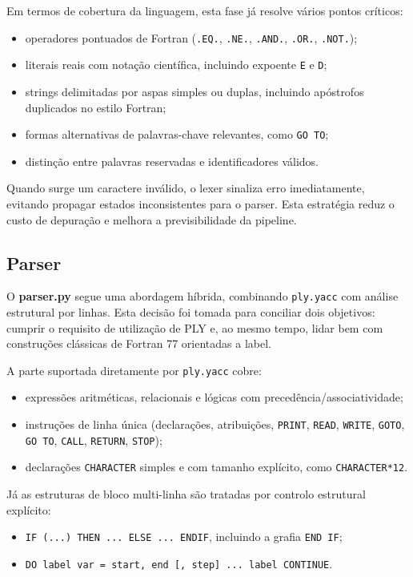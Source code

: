 \documentclass{article}
\begin{document}
Em termos de cobertura da linguagem, esta fase já resolve vários pontos críticos:
\begin{itemize}
\item operadores pontuados de Fortran (\texttt{.EQ.}, \texttt{.NE.}, \texttt{.AND.}, \texttt{.OR.}, \texttt{.NOT.});
\item literais reais com notação científica, incluindo expoente \texttt{E} e \texttt{D};
\item strings delimitadas por aspas simples ou duplas, incluindo apóstrofos duplicados no estilo Fortran;
\item formas alternativas de palavras-chave relevantes, como \texttt{GO TO};
\item distinção entre palavras reservadas e identificadores válidos.
\end{itemize}

Quando surge um caractere inválido, o lexer sinaliza erro imediatamente, evitando propagar estados inconsistentes para o parser. Esta estratégia reduz o custo de depuração e melhora a previsibilidade da pipeline.

\subsection{Parser}

O \textbf{parser.py} segue uma abordagem híbrida, combinando \texttt{ply.yacc} com análise estrutural por linhas. Esta decisão foi tomada para conciliar dois objetivos: cumprir o requisito de utilização de PLY e, ao mesmo tempo, lidar bem com construções clássicas de Fortran 77 orientadas a label.

A parte suportada diretamente por \texttt{ply.yacc} cobre:
\begin{itemize}
\item expressões aritméticas, relacionais e lógicas com precedência/associatividade;
\item instruções de linha única (declarações, atribuições, \texttt{PRINT}, \texttt{READ},
\texttt{WRITE}, \texttt{GOTO}, \texttt{GO TO}, \texttt{CALL}, \texttt{RETURN}, \texttt{STOP});
\item declarações \texttt{CHARACTER} simples e com tamanho explícito, como
\texttt{CHARACTER*12}.
\end{itemize}

Já as estruturas de bloco multi-linha são tratadas por controlo estrutural explícito:
\begin{itemize}
\item \texttt{IF (...) THEN ... ELSE ... ENDIF}, incluindo a grafia \texttt{END IF};
\item \texttt{DO label var = start, end [, step] ... label CONTINUE}.
\end{itemize}
\end{document}
